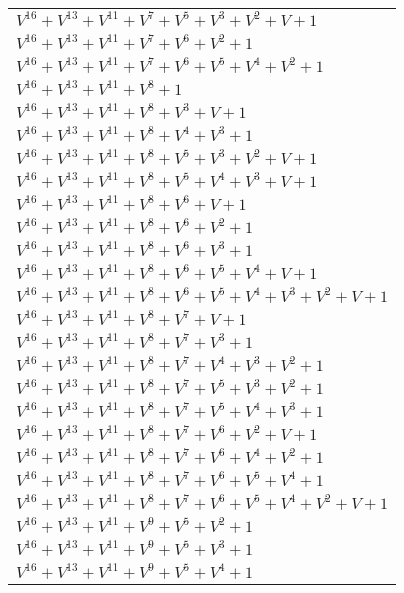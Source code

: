 \documentclass[12pt]{article}
\begin{document}
\begin{adjustwidth}{-4cm}{}
\begin{center}
\begin{longtable}{|l|}
$V^{16}  +V^{13}  +V^{11}  +V^{7}  +V^{5}  +V^{3}  +V^{2}  + V + 1$ \\
$V^{16}  +V^{13}  +V^{11}  +V^{7}  +V^{6}  +V^{2}  + 1$ \\
$V^{16}  +V^{13}  +V^{11}  +V^{7}  +V^{6}  +V^{5}  +V^{4}  +V^{2}  + 1$ \\
$V^{16}  +V^{13}  +V^{11}  +V^{8}  + 1$ \\
$V^{16}  +V^{13}  +V^{11}  +V^{8}  +V^{3}  + V + 1$ \\
$V^{16}  +V^{13}  +V^{11}  +V^{8}  +V^{4}  +V^{3}  + 1$ \\
$V^{16}  +V^{13}  +V^{11}  +V^{8}  +V^{5}  +V^{3}  +V^{2}  + V + 1$ \\
$V^{16}  +V^{13}  +V^{11}  +V^{8}  +V^{5}  +V^{4}  +V^{3}  + V + 1$ \\
$V^{16}  +V^{13}  +V^{11}  +V^{8}  +V^{6}  + V + 1$ \\
$V^{16}  +V^{13}  +V^{11}  +V^{8}  +V^{6}  +V^{2}  + 1$ \\
$V^{16}  +V^{13}  +V^{11}  +V^{8}  +V^{6}  +V^{3}  + 1$ \\
$V^{16}  +V^{13}  +V^{11}  +V^{8}  +V^{6}  +V^{5}  +V^{4}  + V + 1$ \\
$V^{16}  +V^{13}  +V^{11}  +V^{8}  +V^{6}  +V^{5}  +V^{4}  +V^{3}  +V^{2}  + V + 1$ \\
$V^{16}  +V^{13}  +V^{11}  +V^{8}  +V^{7}  + V + 1$ \\
$V^{16}  +V^{13}  +V^{11}  +V^{8}  +V^{7}  +V^{3}  + 1$ \\
$V^{16}  +V^{13}  +V^{11}  +V^{8}  +V^{7}  +V^{4}  +V^{3}  +V^{2}  + 1$ \\
$V^{16}  +V^{13}  +V^{11}  +V^{8}  +V^{7}  +V^{5}  +V^{3}  +V^{2}  + 1$ \\
$V^{16}  +V^{13}  +V^{11}  +V^{8}  +V^{7}  +V^{5}  +V^{4}  +V^{3}  + 1$ \\
$V^{16}  +V^{13}  +V^{11}  +V^{8}  +V^{7}  +V^{6}  +V^{2}  + V + 1$ \\
$V^{16}  +V^{13}  +V^{11}  +V^{8}  +V^{7}  +V^{6}  +V^{4}  +V^{2}  + 1$ \\
$V^{16}  +V^{13}  +V^{11}  +V^{8}  +V^{7}  +V^{6}  +V^{5}  +V^{4}  + 1$ \\
$V^{16}  +V^{13}  +V^{11}  +V^{8}  +V^{7}  +V^{6}  +V^{5}  +V^{4}  +V^{2}  + V + 1$ \\
$V^{16}  +V^{13}  +V^{11}  +V^{9}  +V^{5}  +V^{2}  + 1$ \\
$V^{16}  +V^{13}  +V^{11}  +V^{9}  +V^{5}  +V^{3}  + 1$ \\
$V^{16}  +V^{13}  +V^{11}  +V^{9}  +V^{5}  +V^{4}  + 1$ \\

\end{longtable}
\end{center}
\end{adjustwidth}
\end{document}
